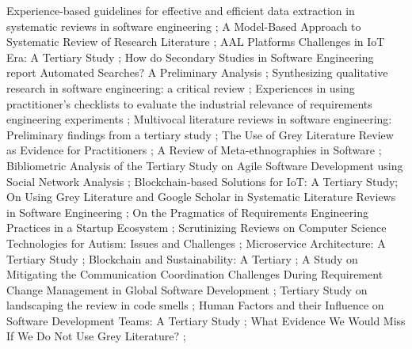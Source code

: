 \documentclass[sigconf]{acmart}
\begin{document}
{\noindent [C2017-027] Experience-based guidelines for effective and efficient data extraction in systematic reviews in software engineering \cite{Garousi2017};\newline
\noindent [C2017-028] A Model-Based Approach to Systematic Review of Research Literature \cite{Barat2017};\newline
\noindent [C2018-012] AAL Platforms Challenges in IoT Era: A Tertiary Study \cite{Duarte2018};\newline
\noindent [C2018-023] How do Secondary Studies in Software Engineering report Automated Searches? A Preliminary Analysis \cite{Singh2018};\newline
\noindent [C2018-029] Synthesizing qualitative research in software engineering: a critical review \cite{Huang2018};\newline
\noindent [W2018-031] Experiences in using practitioner's checklists to evaluate the industrial relevance of requirements engineering experiments \cite{Daneva2018};\newline
\noindent [S2019-008] Multivocal literature reviews in software engineering: Preliminary findings from a tertiary study  \cite{Neto2019};\newline
\noindent [C2019-024] The Use of Grey Literature Review as Evidence for Practitioners \cite{Kamei2019};\newline
\noindent [C2019-025] A Review of Meta-ethnographies in Software \cite{Fu2019};\newline
\noindent [C2020-002] Bibliometric Analysis of the Tertiary Study on Agile Software Development using Social Network Analysis \cite{Bayram2020};\newline
\noindent [C2020-005] Blockchain-based Solutions for IoT: A Tertiary Study\cite{XU2020};\newline
\noindent [C2020-013] On Using Grey Literature and Google Scholar in Systematic Literature Reviews in Software Engineering \cite{Yasin2020};\newline
\noindent [C2020-016] On the Pragmatics of Requirements Engineering Practices in a Startup Ecosystem \cite{Alves2020};\newline
\noindent [C2020-017] Scrutinizing Reviews on Computer Science Technologies for Autism: Issues and Challenges \cite{Epifanio2020};\newline
\noindent [S2020-021] Microservice Architecture: A Tertiary Study \cite{Costa2020};\newline
\noindent [C2021-003] Blockchain and Sustainability: A Tertiary  \cite{Jiang2021};\newline
\noindent [C2021-014] A Study on Mitigating the Communication Coordination Challenges During Requirement Change Management in Global Software Development \cite{Qureshi2021};\newline
\noindent [C2021-019] Tertiary Study on landscaping the review in code smells \cite{Yaqoob2021};\newline
\noindent [S2021-033] Human Factors and their Influence on Software Development Teams: A Tertiary Study \cite{Dutra2021};\newline
\noindent [S2021-034] What Evidence We Would Miss If We Do Not Use Grey Literature? \cite{Kamei2021};
}
\end{document}
